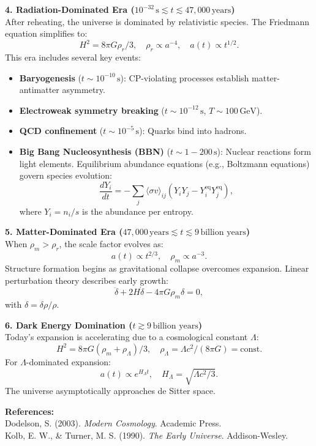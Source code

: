 \begin{technical}
\noindent\textbf{4. Radiation-Dominated Era \boldmath(\( 10^{-32} \, \text{s} \lesssim t \lesssim 47{,}000 \, \text{years} \))}\\[0.3em]
After reheating, the universe is dominated by relativistic species. The Friedmann equation simplifies to:
\[
H^2 = 8\pi G \rho_r/3, \quad \rho_r \propto a^{-4}, \quad a(t) \propto t^{1/2}.
\]
This era includes several key events:
\begin{itemize}
\item \textbf{Baryogenesis} (\( t \sim 10^{-10} \, \text{s} \)): CP-violating processes establish matter-antimatter asymmetry.
\item \textbf{Electroweak symmetry breaking} (\( t \sim 10^{-12} \, \text{s} \), \( T \sim 100\,\text{GeV} \)).
\item \textbf{QCD confinement} (\( t \sim 10^{-5} \, \text{s} \)): Quarks bind into hadrons.
\item \textbf{Big Bang Nucleosynthesis (BBN)} (\( t \sim 1 - 200 \, \text{s} \)): Nuclear reactions form light elements. Equilibrium abundance equations (e.g., Boltzmann equations) govern species evolution:
\[
\frac{dY_i}{dt} = - \sum_j \langle \sigma v \rangle_{ij} \left( Y_i Y_j - Y_i^{\text{eq}} Y_j^{\text{eq}} \right),
\]
where \( Y_i = n_i/s \) is the abundance per entropy.
\end{itemize}

\noindent\textbf{5. Matter-Dominated Era \boldmath(\( 47{,}000 \, \text{years} \lesssim t \lesssim 9\,\text{billion years} \))}\\[0.3em]
When \(\rho_m > \rho_r\), the scale factor evolves as:
\[
a(t) \propto t^{2/3}, \quad \rho_m \propto a^{-3}.
\]
Structure formation begins as gravitational collapse overcomes expansion. Linear perturbation theory describes early growth:
\[
\ddot{\delta} + 2 H \dot{\delta} - 4\pi G \rho_m \delta = 0,
\]
with \(\delta = \delta\rho/\rho\).

\noindent\textbf{6. Dark Energy Domination \boldmath(\( t \gtrsim 9\,\text{billion years} \))}\\[0.3em]
Today's expansion is accelerating due to a cosmological constant \(\Lambda\):
\[
H^2 = 8\pi G (\rho_m + \rho_\Lambda)/3, \quad \rho_\Lambda = \Lambda c^2/(8\pi G) = \text{const.}
\]
For \(\Lambda\)-dominated expansion:
\[
a(t) \propto e^{H_\Lambda t}, \quad H_\Lambda = \sqrt{\Lambda c^2/3}.
\]
The universe asymptotically approaches de Sitter space.

\vspace{0.3em}
\noindent\textbf{References:}\\
Dodelson, S. (2003). \textit{Modern Cosmology}. Academic Press.\\
Kolb, E. W., \& Turner, M. S. (1990). \textit{The Early Universe}. Addison-Wesley.
\end{technical}
